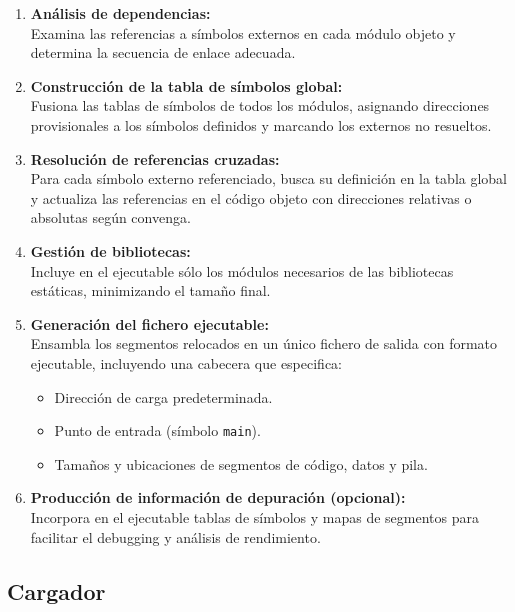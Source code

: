 \documentclass{article}
\begin{document}
\begin{enumerate}
\item \textbf{Análisis de dependencias:}\\
Examina las referencias a símbolos externos en cada módulo objeto y determina la secuencia de enlace adecuada.

\item \textbf{Construcción de la tabla de símbolos global:}\\
Fusiona las tablas de símbolos de todos los módulos, asignando direcciones provisionales a los símbolos definidos y marcando los externos no resueltos.

\item \textbf{Resolución de referencias cruzadas:}\\
Para cada símbolo externo referenciado, busca su definición en la tabla global y actualiza las referencias en el código objeto con direcciones relativas o absolutas según convenga.

\item \textbf{Gestión de bibliotecas:}\\
Incluye en el ejecutable sólo los módulos necesarios de las bibliotecas estáticas, minimizando el tamaño final.

\item \textbf{Generación del fichero ejecutable:}\\
Ensambla los segmentos relocados en un único fichero de salida con formato ejecutable, incluyendo una cabecera que especifica:
\begin{itemize}
\item Dirección de carga predeterminada.
\item Punto de entrada (símbolo \texttt{main}).
\item Tamaños y ubicaciones de segmentos de código, datos y pila.
\end{itemize}

\item \textbf{Producción de información de depuración (opcional):}\\
Incorpora en el ejecutable tablas de símbolos y mapas de segmentos para facilitar el debugging y análisis de rendimiento.
\end{enumerate}

\subsection{Cargador}
\end{document}
